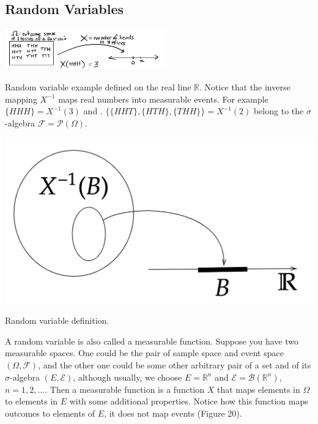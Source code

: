 \documentclass{tufte-handout}
\begin{document}
\subsection{Random Variables}

\begin{marginfigure}
\centering
\includegraphics[width=7cm]{fig/rm.png}
\caption{Random variable example defined on the real line $\mathbb R$. Notice that the inverse mapping $X^{-1}$ maps real numbers into measurable events. For example  $\{HHH\}=X^{-1}(3)$ and  .
$\{\{HHT\}, \{HTH\} , \{THH\}\} =X^{-1}(2)$ belong to the $\sigma$-algebra $\mathcal F = \mathcal P(\Omega)$.
}
\end{marginfigure}

\begin{marginfigure}
\centering
\includegraphics{fig/rvv.png}
\caption{Random variable definition.
}
\end{marginfigure}
A random variable is also called a measurable function. Suppose you have two measurable spaces. One could be the pair of sample space and event space 
$(\Omega, \mathcal F)$, and the other one could be some other arbitrary pair of a set and of its $\sigma$-algebra $(E, \mathcal E)$, although usually, we choose  $E = \mathbb R^n$ and $\mathcal E = \mathcal B(\mathbb R^n)$, $n=1,2,\dots$. Then a measurable function is a function $X$ that maps elements in $\Omega$ to elements in $ E$ with some additional properties. Notice how this function maps outcomes to elements of $E$, it does not map events (Figure 20).
\end{document}
